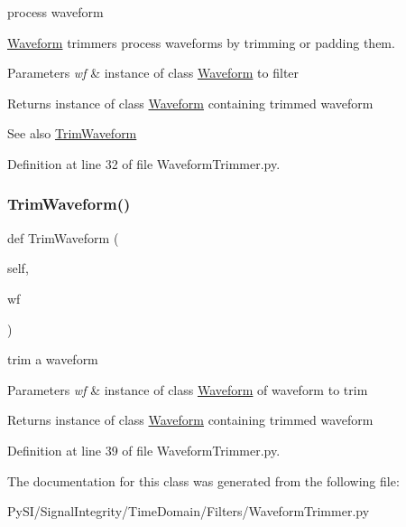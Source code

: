 process waveform 

\hyperlink{namespaceSignalIntegrity_1_1TimeDomain_1_1Waveform}{Waveform} trimmers process waveforms by trimming or padding them.


\begin{DoxyParams}{Parameters}
{\em wf} & instance of class \hyperlink{namespaceSignalIntegrity_1_1TimeDomain_1_1Waveform}{Waveform} to filter \\
\hline
\end{DoxyParams}
\begin{DoxyReturn}{Returns}
instance of class \hyperlink{namespaceSignalIntegrity_1_1TimeDomain_1_1Waveform}{Waveform} containing trimmed waveform 
\end{DoxyReturn}
\begin{DoxySeeAlso}{See also}
\hyperlink{classSignalIntegrity_1_1TimeDomain_1_1Filters_1_1WaveformTrimmer_1_1WaveformTrimmer_aba4602fa45a1eaabd2eb64f1866def53}{Trim\+Waveform} 
\end{DoxySeeAlso}


Definition at line 32 of file Waveform\+Trimmer.\+py.

\mbox{\label{classSignalIntegrity_1_1TimeDomain_1_1Filters_1_1WaveformTrimmer_1_1WaveformTrimmer_aba4602fa45a1eaabd2eb64f1866def53}} 
\subsubsection{\texorpdfstring{Trim\+Waveform()}{TrimWaveform()}}
{\footnotesize\ttfamily def Trim\+Waveform (\begin{DoxyParamCaption}\item[{}]{self,  }\item[{}]{wf }\end{DoxyParamCaption})}



trim a waveform 


\begin{DoxyParams}{Parameters}
{\em wf} & instance of class \hyperlink{namespaceSignalIntegrity_1_1TimeDomain_1_1Waveform}{Waveform} of waveform to trim \\
\hline
\end{DoxyParams}
\begin{DoxyReturn}{Returns}
instance of class \hyperlink{namespaceSignalIntegrity_1_1TimeDomain_1_1Waveform}{Waveform} containing trimmed waveform 
\end{DoxyReturn}


Definition at line 39 of file Waveform\+Trimmer.\+py.



The documentation for this class was generated from the following file\+:\begin{DoxyCompactItemize}
\item 
Py\+S\+I/\+Signal\+Integrity/\+Time\+Domain/\+Filters/Waveform\+Trimmer.\+py\end{DoxyCompactItemize}
